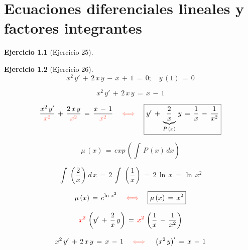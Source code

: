 \documentclass[a4paper,11pt]{book}
\newtheorem{ejer}{Ejercicio}[section]
\begin{document}
  

\chapter{Ecuaciones diferenciales lineales y factores integrantes} 

  

\begin{ejer}[Ejercicio 25] 

  

\end{ejer} 

  

\begin{ejer}[Ejercicio 26] 

  $$x^{2}\,y'\,+\,2\,x\,y\,-\,x\,+\,1\,=\,0; \quad y\,(1)\,=\,0$$ 

  

$$x^{2}\,y'\,+\,2\,x\,y\,=\,x\,-\,1$$ 

  

 

  


  

 $$\dfrac{x^{2}\,y'}{\textcolor{bittersweet}{x^{2}}}\,+\,\dfrac{2\,x\,y }{\textcolor{bittersweet}{x^{2}}}\,=\,\dfrac{x\,-\,1}{\textcolor{bittersweet}{x^{2}} } \quad \textcolor{bittersweet}{\iff} \quad \boxed{y'\,+\,\underbrace{\dfrac{2}{x}}_{P\,(x)}\,y\,=\,\dfrac{1}{x}\,-\,\dfrac{1}{x^{2}} }$$  

  

 $$\mu\,(x)\,=\,exp\,\left(\int\,P\,(x)\,dx \right)$$ 

  

$$\int\,\left(\dfrac{2}{x} \right)\,d\,x\,=\,2\,\int\,\left(\dfrac{1}{x} \right)\,=\,2\,\ln\,x\,=\,\boxed{\ln\,x^{2}}$$ 

  

$$\mu\,(x)\,=\,e^{\ln\,x^{2}} \quad \textcolor{bittersweet}{\iff} \quad \boxed{\mu\,(x)\,=\,x^{2} } $$ 

  

 $$\textcolor{red}{x^{2}}\,\left(y'\,+\,\dfrac{2}{x}\,y \right)\,=\,\textcolor{red}{x^{2}}\,\left(\dfrac{1}{x}\,-\,\dfrac{1}{x^{2}} \right) $$ 

  

$$x^{2}\,y'\,+\,2\,x\,y\,=\,x\,-\,1 \quad \textcolor{bittersweet}{\iff} \quad \left(x^{2}\,y\right)'\,=\,x\,-\,1$$ 

  


\end{ejer}
\end{document}
